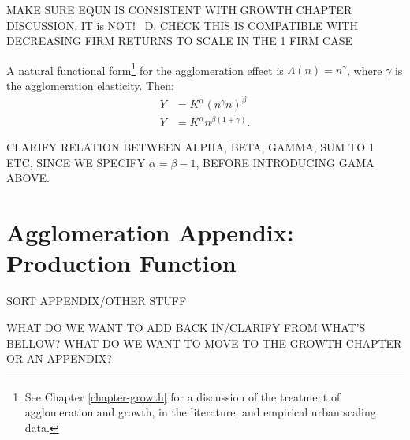 MAKE SURE EQUN IS CONSISTENT WITH GROWTH CHAPTER DISCUSSION.  IT is NOT!~ D.
CHECK THIS IS COMPATIBLE WITH DECREASING FIRM RETURNS TO SCALE IN THE 1 FIRM CASE 

A natural functional form\footnote{See Chapter \ref{chapter-growth} for a discussion of the treatment of agglomeration and growth, in the literature, and empirical urban scaling data.} for the agglomeration effect %
is $\Lambda(n) = n^\gamma$, where $\gamma$ is the agglomeration \gls{elasticity}. Then:
\begin{eqnarray}
 Y&=K^{\alpha }(n^{\gamma}n)^{\beta}  \nonumber\\
 Y&=K^{\alpha }n^{\beta(1 + \gamma)}.
 \label{Eqn:Prod2}
\end{eqnarray}

CLARIFY RELATION BETWEEN ALPHA,  BETA, GAMMA, SUM TO 1 ETC, SINCE WE SPECIFY $\alpha = \beta - 1$, BEFORE INTRODUCING GAMA ABOVE.


\section{Agglomeration Appendix: Production Function}
SORT APPENDIX/OTHER STUFF

WHAT DO WE WANT TO ADD BACK IN/CLARIFY FROM WHAT'S BELLOW? 
WHAT DO WE WANT TO MOVE TO THE GROWTH CHAPTER OR AN APPENDIX?

 

